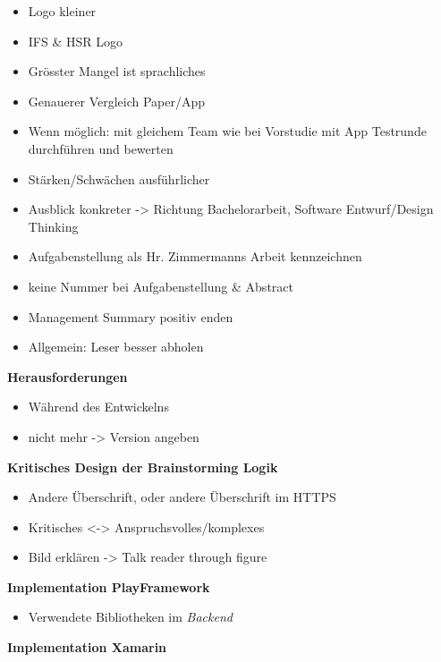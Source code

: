 \begin{itemize}

\item
  Logo kleiner
\item
  IFS \& HSR Logo
\item
  Grösster Mangel ist sprachliches
\item
  Genauerer Vergleich Paper/App
\item
  Wenn möglich: mit gleichem Team wie bei Vorstudie mit App Testrunde
  durchführen und bewerten
\item
  Stärken/Schwächen ausführlicher
\item
  Ausblick konkreter -\textgreater{} Richtung Bachelorarbeit, Software
  Entwurf/Design Thinking
\item
  Aufgabenstellung als Hr. Zimmermanns Arbeit kennzeichnen
\item
  keine Nummer bei Aufgabenstellung \& Abstract
\item
  Management Summary positiv enden
\item
  Allgemein: Leser besser abholen
\end{itemize}

\textbf{Herausforderungen}

\begin{itemize}

\item
  Während des Entwickelns
\item
  nicht mehr -\textgreater{} Version angeben
\end{itemize}

\textbf{Kritisches Design der Brainstorming Logik}

\begin{itemize}

\item
  Andere Überschrift, oder andere Überschrift im HTTPS
\item
  Kritisches \textless{}-\textgreater{} Anspruchsvolles/komplexes
\item
  Bild erklären -\textgreater{} Talk reader through figure
\end{itemize}

\textbf{Implementation PlayFramework}

\begin{itemize}

\item
  Verwendete Bibliotheken im \emph{Backend}
\end{itemize}

\textbf{Implementation Xamarin}

